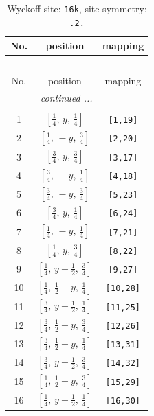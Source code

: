\documentclass[fleqn,8pt]{jsarticle}
\begin{document}
\renewcommand{\arraystretch}{1.2}
\begin{longtable}{ccc}
\caption{Wyckoff site: {\tt 16k}, site symmetry: {\tt .2.}}
 \\
 \hline \hline
No. & position & mapping \\ \hline \endfirsthead

\multicolumn{2}{l}{\tablename\ \thetable{}} \\
 \hline \hline
No. & position & mapping \\ \hline \endhead

 \hline \hline
\multicolumn{2}{r}{\footnotesize\it continued ...} \\ \endfoot

 \hline \hline
\multicolumn{2}{r}{} \\ \endlastfoot

1 & $\left[ \frac{1}{4},\, y,\, \frac{1}{4} \right]$ & {\tt [1,19]} \\ \hline
2 & $\left[ \frac{1}{4},\, - y,\, \frac{3}{4} \right]$ & {\tt [2,20]} \\ \hline
3 & $\left[ \frac{3}{4},\, y,\, \frac{3}{4} \right]$ & {\tt [3,17]} \\ \hline
4 & $\left[ \frac{3}{4},\, - y,\, \frac{1}{4} \right]$ & {\tt [4,18]} \\ \hline
5 & $\left[ \frac{3}{4},\, - y,\, \frac{3}{4} \right]$ & {\tt [5,23]} \\ \hline
6 & $\left[ \frac{3}{4},\, y,\, \frac{1}{4} \right]$ & {\tt [6,24]} \\ \hline
7 & $\left[ \frac{1}{4},\, - y,\, \frac{1}{4} \right]$ & {\tt [7,21]} \\ \hline
8 & $\left[ \frac{1}{4},\, y,\, \frac{3}{4} \right]$ & {\tt [8,22]} \\ \hline
9 & $\left[ \frac{1}{4},\, y + \frac{1}{2},\, \frac{3}{4} \right]$ & {\tt [9,27]} \\ \hline
10 & $\left[ \frac{1}{4},\, \frac{1}{2} - y,\, \frac{1}{4} \right]$ & {\tt [10,28]} \\ \hline
11 & $\left[ \frac{3}{4},\, y + \frac{1}{2},\, \frac{1}{4} \right]$ & {\tt [11,25]} \\ \hline
12 & $\left[ \frac{3}{4},\, \frac{1}{2} - y,\, \frac{3}{4} \right]$ & {\tt [12,26]} \\ \hline
13 & $\left[ \frac{3}{4},\, \frac{1}{2} - y,\, \frac{1}{4} \right]$ & {\tt [13,31]} \\ \hline
14 & $\left[ \frac{3}{4},\, y + \frac{1}{2},\, \frac{3}{4} \right]$ & {\tt [14,32]} \\ \hline
15 & $\left[ \frac{1}{4},\, \frac{1}{2} - y,\, \frac{3}{4} \right]$ & {\tt [15,29]} \\ \hline
16 & $\left[ \frac{1}{4},\, y + \frac{1}{2},\, \frac{1}{4} \right]$ & {\tt [16,30]} \\
\end{longtable}
\end{document}
